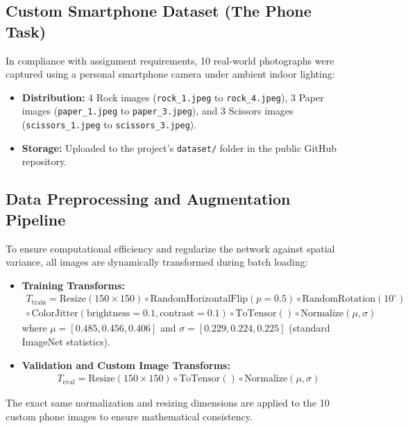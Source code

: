 \documentclass[11pt,a4paper]{article}
\begin{document}
\subsection{Custom Smartphone Dataset (The Phone Task)}
In compliance with assignment requirements, 10 real-world photographs were captured using a personal smartphone camera under ambient indoor lighting:
\begin{itemize}[leftmargin=1.5em, itemsep=2pt]
    \item \textbf{Distribution:} 4 Rock images (\texttt{rock\_1.jpeg} to \texttt{rock\_4.jpeg}), 3 Paper images (\texttt{paper\_1.jpeg} to \texttt{paper\_3.jpeg}), and 3 Scissors images (\texttt{scissors\_1.jpeg} to \texttt{scissors\_3.jpeg}).
    \item \textbf{Storage:} Uploaded to the project's \texttt{dataset/} folder in the public GitHub repository.
\end{itemize}

\subsection{Data Preprocessing and Augmentation Pipeline}
To ensure computational efficiency and regularize the network against spatial variance, all images are dynamically transformed during batch loading:
\begin{itemize}[leftmargin=1.5em, itemsep=2pt]
    \item \textbf{Training Transforms:} 
    \begin{align*}
        T_{\text{train}} = \text{Resize}(150 \times 150) \circ \text{RandomHorizontalFlip}(p=0.5) \circ \text{RandomRotation}(10^\circ) \\
        \circ\, \text{ColorJitter}(\text{brightness}=0.1, \text{contrast}=0.1) \circ \text{ToTensor}() \circ \text{Normalize}(\mu, \sigma)
    \end{align*}
    where $\mu = [0.485, 0.456, 0.406]$ and $\sigma = [0.229, 0.224, 0.225]$ (standard ImageNet statistics).
    \item \textbf{Validation and Custom Image Transforms:}
    \begin{align*}
        T_{\text{eval}} = \text{Resize}(150 \times 150) \circ \text{ToTensor}() \circ \text{Normalize}(\mu, \sigma)
    \end{align*}
\end{itemize}
The exact same normalization and resizing dimensions are applied to the 10 custom phone images to ensure mathematical consistency.
\end{document}
